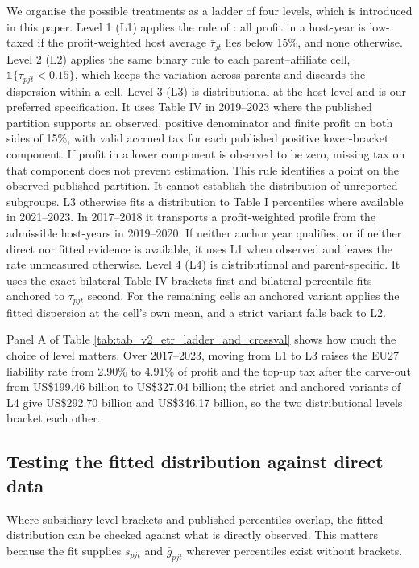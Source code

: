 \documentclass[11pt,a4paper]{article}
\newcommand{\usd}{US\$}
\begin{document}
We organise the possible treatments as a ladder of four levels, which is introduced in this paper. Level 1 (L1) applies the rule of \citet{barake2022}: all profit in a host-year is low-taxed if the profit-weighted host average $\bar\tau_{jt}$ lies below 15\%, and none otherwise. Level 2 (L2) applies the same binary rule to each parent–affiliate cell, $\mathbb{1}\{\tau_{pjt}<0.15\}$, which keeps the variation across parents and discards the dispersion within a cell. Level 3 (L3) is distributional at the host level and is our preferred specification. It uses Table IV in 2019–2023 where the published partition supports an observed, positive denominator and finite profit on both sides of 15\%, with valid accrued tax for each published positive lower-bracket component. If profit in a lower component is observed to be zero, missing tax on that component does not prevent estimation. This rule identifies a point on the observed published partition. It cannot establish the distribution of unreported subgroups. L3 otherwise fits a distribution to Table I percentiles where available in 2021–2023. In 2017–2018 it transports a profit-weighted profile from the admissible host-years in 2019–2020. If neither anchor year qualifies, or if neither direct nor fitted evidence is available, it uses L1 when observed and leaves the rate unmeasured otherwise. Level 4 (L4) is distributional and parent-specific. It uses the exact bilateral Table IV brackets first and bilateral percentile fits anchored to $\tau_{pjt}$ second. For the remaining cells an anchored variant applies the fitted dispersion at the cell's own mean, and a strict variant falls back to L2.



Panel A of Table \ref{tab:tab_v2_etr_ladder_and_crossval} shows how much the choice of level matters. Over 2017–2023, moving from L1 to L3 raises the EU27 liability rate from 2.90\% to 4.91\% of profit and the top-up tax after the carve-out from \usd199.46 billion to \usd327.04 billion; the strict and anchored variants of L4 give \usd292.70 billion and \usd346.17 billion, so the two distributional levels bracket each other.

\subsection{Testing the fitted distribution against direct data}\label{sec:etr_validation}

Where subsidiary-level brackets and published percentiles overlap, the fitted distribution can be checked against what is directly observed. This matters because the fit supplies $s_{pjt}$ and $\bar g_{pjt}$ wherever percentiles exist without brackets.
\end{document}
